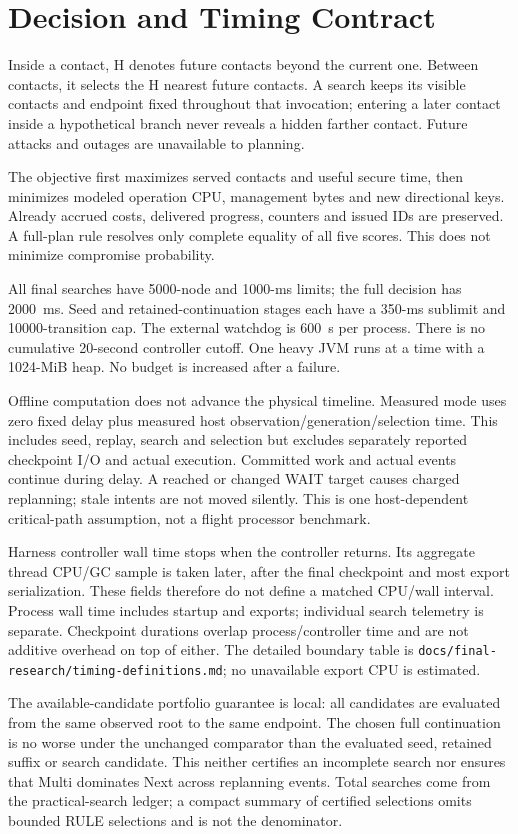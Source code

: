 \documentclass[11pt]{article}
\begin{document}
\section{Decision and Timing Contract}
Inside a contact, H denotes future contacts beyond the current one. Between contacts, it
selects the H nearest future contacts. A search keeps its visible contacts and endpoint fixed
throughout that invocation; entering a later contact inside a hypothetical branch never
reveals a hidden farther contact. Future attacks and outages are unavailable to planning.

The objective first maximizes served contacts and useful secure time, then minimizes
modeled operation CPU, management bytes and new directional keys. Already accrued costs,
delivered progress, counters and issued IDs are preserved. A full-plan rule resolves only
complete equality of all five scores. This does not minimize compromise probability.

All final searches have 5000-node and 1000-ms limits; the full decision has 2000~ms. Seed and
retained-continuation stages each have a 350-ms sublimit and 10000-transition cap. The
external watchdog is 600~s per process. There is no cumulative 20-second controller cutoff.
One heavy JVM runs at a time with a 1024-MiB heap. No budget is increased after a failure.

Offline computation does not advance the physical timeline. Measured mode uses zero fixed
delay plus measured host observation/generation/selection time. This includes seed, replay,
search and selection but excludes separately reported checkpoint I/O and actual execution.
Committed work and actual events continue during delay. A reached or changed WAIT target
causes charged replanning; stale intents are not moved silently. This is one host-dependent
critical-path assumption, not a flight processor benchmark.

Harness controller wall time stops when the controller returns. Its aggregate thread CPU/GC
sample is taken later, after the final checkpoint and most export serialization. These fields
therefore do not define a matched CPU/wall interval. Process wall time includes startup and
exports; individual search telemetry is separate. Checkpoint durations overlap process/controller
time and are not additive overhead on top of either. The detailed boundary table is
\texttt{docs/final-research/timing-definitions.md}; no unavailable export CPU is estimated.

The available-candidate portfolio guarantee is local: all candidates are evaluated from the
same observed root to the same endpoint. The chosen full continuation is no worse under
the unchanged comparator than the evaluated seed, retained suffix or search candidate.
This neither certifies an incomplete search nor ensures that Multi dominates Next across
replanning events. Total searches come from the practical-search ledger; a compact summary
of certified selections omits bounded RULE selections and is not the denominator.
\end{document}
